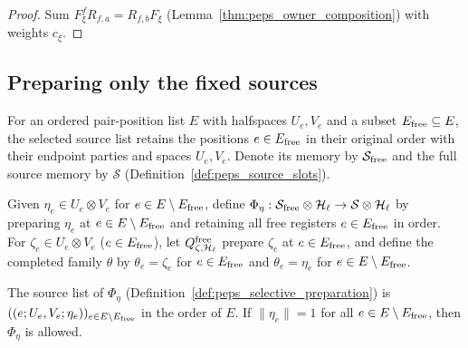 \begin{proof}
    \leanok
    Sum $F_\xi^fR_{f,a}=R_{f,b}F_\xi$ (Lemma~\ref{thm:peps_owner_composition})
    with weights $c_\xi$.
\end{proof}


\subsection{Preparing only the fixed sources}

\begin{definition}
    \label{def:peps_selected_source_positions}
    \leanok
    For an ordered pair-position list $E$ with halfspaces $U_e,V_e$ and a subset
    $E_{\rm free}\subseteq E$, the selected source list retains the positions
    $e\in E_{\rm free}$ in their original order with their endpoint parties and
    spaces $U_e,V_e$. Denote its memory by $\mathcal S_{\rm free}$ and the
    full source memory by $\mathcal S$ (Definition~\ref{def:peps_source_slots}).
\end{definition}

\begin{definition}
    \label{def:peps_selective_preparation}
    \leanok
    Given $\eta_e\in U_e\otimes V_e$ for $e\in E\setminus E_{\rm free}$, define
    $\Phi_\eta:\mathcal S_{\rm free}\otimes\mathcal H_\ell\to\mathcal S\otimes\mathcal H_\ell$
    by preparing $\eta_e$ at $e\in E\setminus E_{\rm free}$ and retaining all
    free registers $e\in E_{\rm free}$ in order. For $\zeta_e\in U_e\otimes V_e$
    ($e\in E_{\rm free}$), let $Q^{\rm free}_{\zeta,\mathcal H_\ell}$ prepare
    $\zeta_e$ at $e\in E_{\rm free}$, and define the completed family $\theta$ by
    $\theta_e=\zeta_e$ for $e\in E_{\rm free}$ and $\theta_e=\eta_e$ for
    $e\in E\setminus E_{\rm free}$.
\end{definition}

\begin{lemma}
    \label{thm:peps_selective_preparation_sources}
    \leanok
    The source list of $\Phi_\eta$ (Definition~\ref{def:peps_selective_preparation})
    is $((e;U_e,V_e;\eta_e))_{e\in E\setminus E_{\rm free}}$ in the order of
    $E$. If $\|\eta_e\|=1$ for all $e\in E\setminus E_{\rm free}$, then
    $\Phi_\eta$ is allowed.
\end{lemma}

